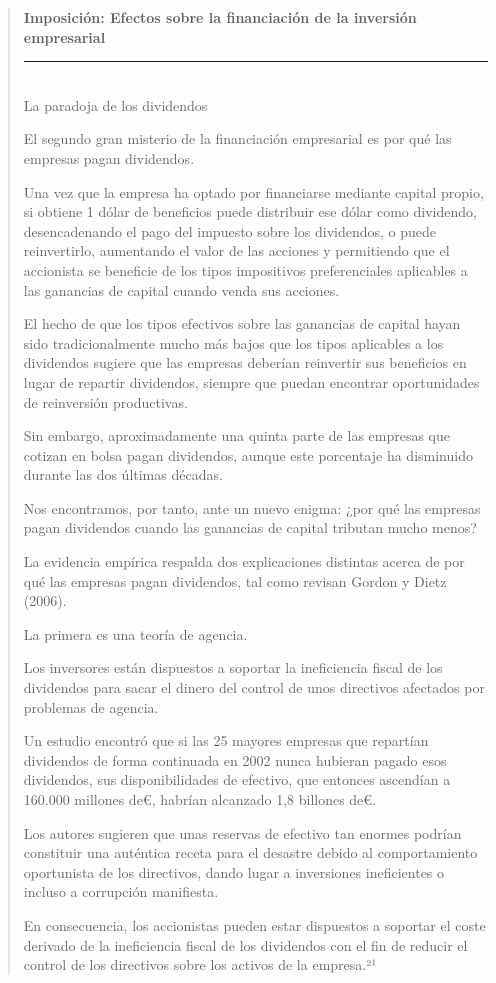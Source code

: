 \documentclass[10pt,a4paper]{article}
\newenvironment{specialblock}[1]{%
      \begin{quote} %
      \small %
      \noindent\textbf{#1}\\[-0.3em] %
      \rule{\linewidth}{0.4pt}\\[0.6em]}{
      \end{quote}}
\begin{document}
\begin{specialblock}{Imposición: Efectos sobre la financiación de la inversión empresarial}
    La paradoja de los dividendos
    
    El segundo gran misterio de la financiación empresarial es por qué las empresas pagan dividendos.
    
    Una vez que la empresa ha optado por financiarse mediante capital propio, si obtiene 1 dólar de beneficios puede distribuir ese dólar como dividendo, desencadenando el pago del impuesto sobre los dividendos, o puede reinvertirlo, aumentando el valor de las acciones y permitiendo que el accionista se beneficie de los tipos impositivos preferenciales aplicables a las ganancias de capital cuando venda sus acciones.
    
    El hecho de que los tipos efectivos sobre las ganancias de capital hayan sido tradicionalmente mucho más bajos que los tipos aplicables a los dividendos sugiere que las empresas deberían reinvertir sus beneficios en lugar de repartir dividendos, siempre que puedan encontrar oportunidades de reinversión productivas.
    
    Sin embargo, aproximadamente una quinta parte de las empresas que cotizan en bolsa pagan dividendos, aunque este porcentaje ha disminuido durante las dos últimas décadas.
    
    Nos encontramos, por tanto, ante un nuevo enigma: ¿por qué las empresas pagan dividendos cuando las ganancias de capital tributan mucho menos?
    
    La evidencia empírica respalda dos explicaciones distintas acerca de por qué las empresas pagan dividendos, tal como revisan Gordon y Dietz (2006).
    
    La primera es una teoría de agencia.
    
    Los inversores están dispuestos a soportar la ineficiencia fiscal de los dividendos para sacar el dinero del control de unos directivos afectados por problemas de agencia.
    
    Un estudio encontró que si las 25 mayores empresas que repartían dividendos de forma continuada en 2002 nunca hubieran pagado esos dividendos, sus disponibilidades de efectivo, que entonces ascendían a 160.000 millones de€, habrían alcanzado 1,8 billones de€.
    
    Los autores sugieren que unas reservas de efectivo tan enormes podrían constituir una auténtica receta para el desastre debido al comportamiento oportunista de los directivos, dando lugar a inversiones ineficientes o incluso a corrupción manifiesta.
    
    En consecuencia, los accionistas pueden estar dispuestos a soportar el coste derivado de la ineficiencia fiscal de los dividendos con el fin de reducir el control de los directivos sobre los activos de la empresa.²¹
    

\end{specialblock}
\end{document}
